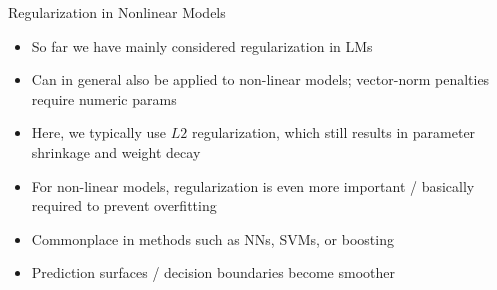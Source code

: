 \documentclass[11pt,compress,t,notes=noshow, xcolor=table]{beamer}
\begin{document}
\begin{vbframe}{Regularization in Nonlinear Models}

\begin{itemize}
  \item So far we have mainly considered regularization in LMs
  \item Can in general also be applied to non-linear models; vector-norm penalties require numeric params 
  \item Here, we typically use $L2$ regularization, which
    still results in parameter shrinkage and weight decay
  \item For non-linear models, regularization is even more important / basically required to prevent overfitting
  \item Commonplace in methods such as NNs, SVMs, or boosting
  \item Prediction surfaces / decision boundaries become smoother
\end{itemize}

\end{vbframe}
\end{document}
